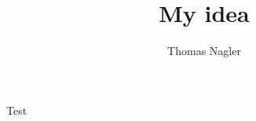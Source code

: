 \documentclass[12pt, headinclude=true]{scrartcl}
\title{My idea}
\author{Thomas Nagler}
\begin{document}
\maketitle
Test
\end{document}

